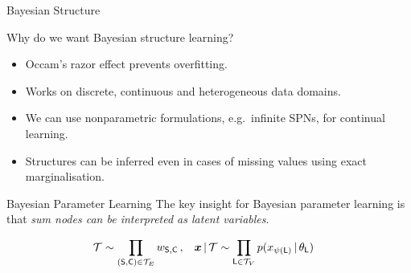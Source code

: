 \begin{frame}{Bayesian Structure}
\begin{block}{Why do we want Bayesian structure learning?}
\begin{itemize}
        \item Occam's razor effect prevents overfitting.
        \item Works on discrete, continuous and heterogeneous data domains.
        \item We can use nonparametric formulations, e.g.~infinite SPNs, for continual learning.
        \item Structures can be inferred even in cases of missing values using exact marginalisation.
    \end{itemize}
\end{block}
\end{frame}

\begin{frame}{Bayesian Parameter Learning}
The key insight for Bayesian parameter learning is that \emph{sum nodes can be interpreted as latent variables}.

\pause
\begin{figure}
  \centering{
    
    }
\end{figure}

\begin{align}
    \mathcal{T} &\sim \prod_{(\mathsf{S},\mathsf{C}) \in \mathcal{T}_E} w_{\mathsf{S},\mathsf{C}}\, ,& \bm x \,|\, \mathcal{T} &\sim \prod_{\mathsf{L} \in \mathcal{T}_V} p(x_{\psi(\mathsf{L})} \,|\, \theta_{\mathsf{L}})
\end{align}

\end{frame}

